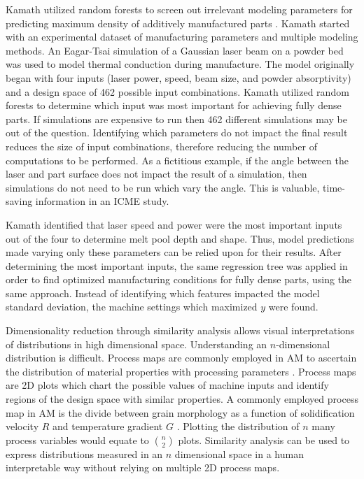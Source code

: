 Kamath utilized random forests to screen out irrelevant modeling parameters for predicting maximum density of additively manufactured parts \cite{Kamath2016}. Kamath started with an experimental dataset of manufacturing parameters and multiple modeling methods. An Eagar-Tsai simulation of a Gaussian laser beam on a powder bed was used to model thermal conduction during manufacture. The model originally began with four inputs (laser power, speed, beam size, and powder absorptivity) and a design space of 462 possible input combinations. Kamath utilized random forests to determine which input was most important for achieving fully dense parts. If simulations are expensive to run then 462 different simulations may be out of the question. Identifying which parameters do not impact the final result reduces the size of input combinations, therefore reducing the number of computations to be performed. As a fictitious example, if the angle between the laser and part surface does not impact the result of a simulation, then simulations do not need to be run which vary the angle. This is valuable, time-saving information in an ICME study.

Kamath identified that laser speed and power were the most important inputs out of the four to determine melt pool depth and shape. Thus, model predictions made varying only these parameters can be relied upon for their results.  After determining the most important inputs, the same regression tree was applied in order to find optimized manufacturing conditions for fully dense parts, using the same approach. Instead of identifying which features impacted the model standard deviation, the machine settings which maximized $y$ were found. 

Dimensionality reduction through similarity analysis allows visual interpretations of distributions in high dimensional space. Understanding an $n$-dimensional distribution is difficult. Process maps are commonly employed in AM to ascertain the distribution of material properties with processing parameters \cite{Beuth2001}. Process maps are 2D plots which chart the possible values of machine inputs and identify regions of the design space with similar properties. A commonly employed process map in AM is the divide between grain morphology as a function of solidification velocity $R$ and temperature gradient $G$ \cite{DeHoff2015}. Plotting the distribution of $n$ many process variables would equate to ${n \choose 2}$ plots. Similarity analysis can be used to express distributions measured in an $n$ dimensional space in a human interpretable way without relying on multiple 2D process maps. 

